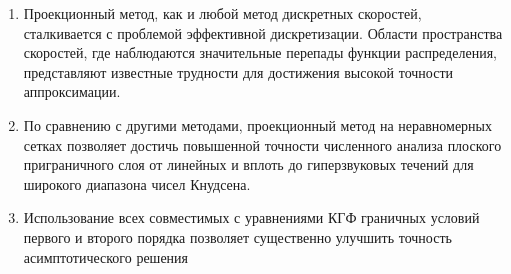 \begin{enumerate}
\item Проекционный метод, как и любой метод дискретных скоростей, сталкивается с проблемой
эффективной дискретизации. Области пространства скоростей,
где наблюдаются значительные перепады функции распределения, представляют известные трудности
для достижения высокой точности аппроксимации.

\item По сравнению с другими методами, проекционный метод на неравномерных сетках
позволяет достичь повышенной точности численного анализа плоского приграничного слоя
от линейных и вплоть до гиперзвуковых течений для широкого диапазона чисел Кнудсена.

\item Использование всех совместимых с уравнениями КГФ граничных условий первого и второго порядка
позволяет существенно улучшить точность асимптотического решения

\end{enumerate}
